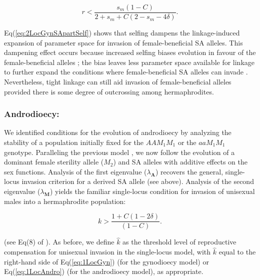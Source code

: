 \documentclass{article}
\newcommand\hl[1]{%
  \bgroup
  \hskip0pt\color{blue!80!black}%
  #1%
  \egroup
}
\begin{document}
\begin{equation}\label{eq:2LocGynSApartSelf}
	r < \frac{s_m (1 - C)}{2 + s_m + C (2 - s_m - 4 \delta)}.
\end{equation}

\noindent Eq(\ref{eq:2LocGynSApartSelf}) shows that selfing dampens the linkage-induced expansion of parameter space for invasion of female-beneficial SA alleles. \hl{This dampening effect occurs because increased selfing biases evolution in favour of the female-beneficial alleles \citep{Olito2017}; the bias leaves less parameter space available for linkage to further expand the conditions where female-beneficial SA alleles can invade}. Nevertheless, tight linkage can still aid invasion of female-beneficial alleles provided there is some degree of outcrossing among hermaphrodites. 


\subsubsection*{Androdioecy:} We identified conditions for the evolution of androdioecy by analyzing the stability of a population initially fixed for the $AAM_1M_1$ or the $aaM_1M_1$ genotype. \hl{Paralleling the previous model}, we now follow the evolution of a dominant female sterility allele ($M_2$) and SA alleles with additive effects on the sex functions. Analysis of the first eigenvalue ($\lambda_{\mathbf{A}}$) recovers the general, single-locus invasion criterion for a derived SA allele (see above). Analysis of the second eigenvalue ($\lambda_{\mathbf{M}}$) yields the familiar single-locus condition for invasion of unisexual males into a hermaphrodite population:

\begin{equation}\label{eq:1LocAndro}
	k > \frac{1 + C (1 - 2 \delta)}{(1 - C)}.
\end{equation}

\noindent (see Eq(8) of \citealt{Charlesworth1978a}). As before, we define $\hat{k}$ as the threshold level of reproductive compensation for unisexual invasion in the single-locus model, with $\hat{k}$ equal to the right-hand side of Eq(\ref{eq:1LocGyn}) (for the gynodioecy model) or Eq(\ref{eq:1LocAndro}) (for the androdioecy model), as appropriate.
\end{document}
